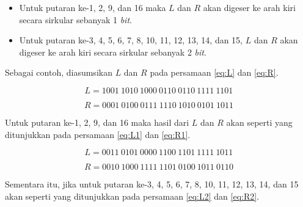 \begin{itemize}
	\item Untuk putaran ke-1, 2, 9, dan 16 maka \begin{math}L\end{math} dan \begin{math}R\end{math} akan digeser ke arah kiri secara sirkular sebanyak 1 \textit{bit}.
	\item Untuk putaran ke-3, 4, 5, 6, 7, 8, 10, 11, 12, 13, 14, dan 15, \begin{math}L\end{math} dan \begin{math}R\end{math} akan digeser ke arah kiri secara sirkular sebanyak 2 \textit{bit}.
\end{itemize}

Sebagai contoh, diasumsikan \begin{math}L\end{math} dan \begin{math}R\end{math} pada persamaan \ref{eq:L} dan \ref{eq:R}.

\begin{equation}
	L = 1001\: 1010\: 1000\: 0110\: 0110\: 1111\: 1101
	\label{eq:L}
\end{equation}

\begin{equation}
	R = 0001\: 0100\: 0111\: 1110\: 1010\: 0101\: 1011
	\label{eq:R}
\end{equation}

Untuk putaran ke-1, 2, 9, dan 16 maka hasil dari \begin{math}L\end{math} dan \begin{math}R\end{math} akan seperti yang ditunjukkan pada persamaan \ref{eq:L1} dan \ref{eq:R1}.

\begin{equation}
	L = 0011\: 0101\: 0000\: 1100\: 1101\: 1111\: 1011
	\label{eq:L1}
\end{equation}

\begin{equation}
	R = 0010\: 1000\: 1111\: 1101\: 0100\: 1011\: 0110
	\label{eq:R1}
\end{equation}

Sementara itu, jika untuk putaran ke-3, 4, 5, 6, 7, 8, 10, 11, 12, 13, 14, dan 15 akan seperti yang ditunjukkan pada persamaan \ref{eq:L2} dan \ref{eq:R2}.

